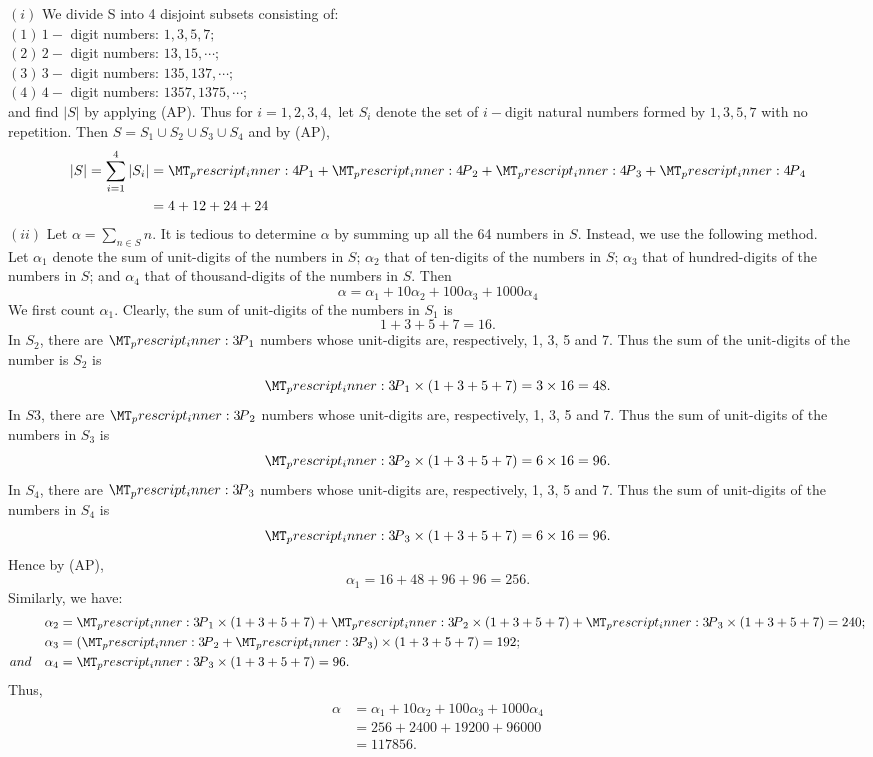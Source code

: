 \documentclass[a4paper,11pt]{book}
\newcommand\perm[2][^n]{\prescript{#1\mkern-2.5mu}{}P_{#2}}
\begin{document}
\begin{soln}
$(i)$ We divide S into 4 disjoint subsets consisting of:\\ 
$(1)\,1-$ digit numbers: $1,3,5,7;$ \\
$(2)\, 2-$ digit numbers: $13, 15, \cdots;$ \\
$(3)\, 3-$ digit numbers: $135, 137, \cdots;$ \\
$(4)\, 4-$ digit numbers: $1357, 1375, \cdots;$ \\
and find $|S|$ by applying (AP). Thus for $i = 1,2,3,4,$ let $S_{i}$ denote the 
set of $i-$digit natural numbers formed by $1,3,5,7$ with no repetition. Then 
$S = S_1 \cup S_2 \cup S_3 \cup S_4$ and by (AP), 
\begin{align*}
 |S| = \sum\limits_{i=1}^{4} |S_{i}| &= \perm[4]{1} + \perm[4]{2} + \perm[4]{3} + \perm[4]{4} \\
     &= 4+12+24+24 
 \end{align*}
$(ii)$ Let $\alpha = \sum\limits_{n\in S} n $. It is tedious to determine $\alpha$ by summing up all the 64 numbers in $S$. Instead, we use the following method. \\

Let $\alpha_{1}$ denote the sum of unit-digits of the numbers in $S;\,\alpha_{2}$ that of ten-digits of the numbers in $S;\,\alpha_{3}$ that of hundred-digits of the numbers in $S$; and $\alpha_4$ that of thousand-digits of the numbers in $S$. Then 
\[ \alpha = \alpha_{1} + 10\alpha_{2} + 100\alpha_{3} + 1000\alpha_{4}  \]
We first count $\alpha_{1}$. Clearly, the sum of unit-digits of the numbers in $S_{1}$ is
\[1 + 3 + 5 + 7 = 16. \]
In $S_2$, there are $\perm[3]{1}$ numbers whose unit-digits are, respectively, 1, 3, 5 and 7. Thus the sum of the unit-digits of the number is $S_2$ is 
\[ \perm[3]{1} \times (1 + 3 + 5 + 7) = 3 \times 16 = 48.\] 
In $S3$, there are $\perm[3]{2}$ numbers whose unit-digits are, respectively, 1, 3, 5 and 7. Thus the sum of unit-digits of the numbers in $S_3$ is 
\[ \perm[3]{2} \times (1 + 3 + 5 + 7) = 6 \times 16 = 96. \]
In $S_4$, there are $\perm[3]{3}$ numbers whose unit-digits are, respectively, 1, 3, 5 and 
7. Thus the sum of unit-digits of the numbers in $S_4$ is 
\[ \perm[3]{3} \times (1 + 3 + 5 + 7) = 6 \times 16 = 96. \]
Hence by (AP), 
\[ \alpha_{1} = 16 + 48 + 96 + 96 = 256. \]
Similarly, we have: 
\begin{align*}
 \alpha_2 &= \perm[3]{1} \times (1 + 3 + 5 + 7) + \perm[3]{2} \times (1 + 3 + 5 + 7) + \perm[3]{3} \times (1 + 3 + 5 + 7) = 240; \\
\alpha_{3} &=(\perm[3]{2} + \perm[3]{3}) \times (1 + 3 + 5 + 7) = 192;\\ 
 and\quad \alpha_{4} &=\perm[3]{3} \times (1 + 3 + 5 + 7) = 96. 
\end{align*} 
Thus, 
\begin{align*}
 \alpha &= \alpha_{1} + 10\alpha_{2} + 100\alpha_{3} + 1000\alpha_{4}  \\
 &=  256 + 2400 + 19200 + 96000\\ 
 &= 117856. 
\end{align*}
\end{soln}
\end{document}
